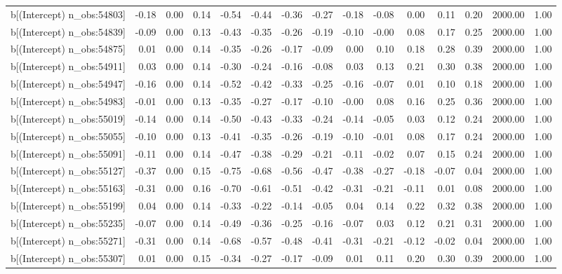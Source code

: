 \begin{table}[ht]
\begin{tabular}{rrrrrrrrrrrrrrr}
  b[(Intercept) n\_obs:54803] & -0.18 & 0.00 & 0.14 & -0.54 & -0.44 & -0.36 & -0.27 & -0.18 & -0.08 & 0.00 & 0.11 & 0.20 & 2000.00 & 1.00 \\ 
  b[(Intercept) n\_obs:54839] & -0.09 & 0.00 & 0.13 & -0.43 & -0.35 & -0.26 & -0.19 & -0.10 & -0.00 & 0.08 & 0.17 & 0.25 & 2000.00 & 1.00 \\ 
  b[(Intercept) n\_obs:54875] & 0.01 & 0.00 & 0.14 & -0.35 & -0.26 & -0.17 & -0.09 & 0.00 & 0.10 & 0.18 & 0.28 & 0.39 & 2000.00 & 1.00 \\ 
  b[(Intercept) n\_obs:54911] & 0.03 & 0.00 & 0.14 & -0.30 & -0.24 & -0.16 & -0.08 & 0.03 & 0.13 & 0.21 & 0.30 & 0.38 & 2000.00 & 1.00 \\ 
  b[(Intercept) n\_obs:54947] & -0.16 & 0.00 & 0.14 & -0.52 & -0.42 & -0.33 & -0.25 & -0.16 & -0.07 & 0.01 & 0.10 & 0.18 & 2000.00 & 1.00 \\ 
  b[(Intercept) n\_obs:54983] & -0.01 & 0.00 & 0.13 & -0.35 & -0.27 & -0.17 & -0.10 & -0.00 & 0.08 & 0.16 & 0.25 & 0.36 & 2000.00 & 1.00 \\ 
  b[(Intercept) n\_obs:55019] & -0.14 & 0.00 & 0.14 & -0.50 & -0.43 & -0.33 & -0.24 & -0.14 & -0.05 & 0.03 & 0.12 & 0.24 & 2000.00 & 1.00 \\ 
  b[(Intercept) n\_obs:55055] & -0.10 & 0.00 & 0.13 & -0.41 & -0.35 & -0.26 & -0.19 & -0.10 & -0.01 & 0.08 & 0.17 & 0.24 & 2000.00 & 1.00 \\ 
  b[(Intercept) n\_obs:55091] & -0.11 & 0.00 & 0.14 & -0.47 & -0.38 & -0.29 & -0.21 & -0.11 & -0.02 & 0.07 & 0.15 & 0.24 & 2000.00 & 1.00 \\ 
  b[(Intercept) n\_obs:55127] & -0.37 & 0.00 & 0.15 & -0.75 & -0.68 & -0.56 & -0.47 & -0.38 & -0.27 & -0.18 & -0.07 & 0.04 & 2000.00 & 1.00 \\ 
  b[(Intercept) n\_obs:55163] & -0.31 & 0.00 & 0.16 & -0.70 & -0.61 & -0.51 & -0.42 & -0.31 & -0.21 & -0.11 & 0.01 & 0.08 & 2000.00 & 1.00 \\ 
  b[(Intercept) n\_obs:55199] & 0.04 & 0.00 & 0.14 & -0.33 & -0.22 & -0.14 & -0.05 & 0.04 & 0.14 & 0.22 & 0.32 & 0.38 & 2000.00 & 1.00 \\ 
  b[(Intercept) n\_obs:55235] & -0.07 & 0.00 & 0.14 & -0.49 & -0.36 & -0.25 & -0.16 & -0.07 & 0.03 & 0.12 & 0.21 & 0.31 & 2000.00 & 1.00 \\ 
  b[(Intercept) n\_obs:55271] & -0.31 & 0.00 & 0.14 & -0.68 & -0.57 & -0.48 & -0.41 & -0.31 & -0.21 & -0.12 & -0.02 & 0.04 & 2000.00 & 1.00 \\ 
  b[(Intercept) n\_obs:55307] & 0.01 & 0.00 & 0.15 & -0.34 & -0.27 & -0.17 & -0.09 & 0.01 & 0.11 & 0.20 & 0.30 & 0.39 & 2000.00 & 1.00 \\ 

\end{tabular}
\end{table}
